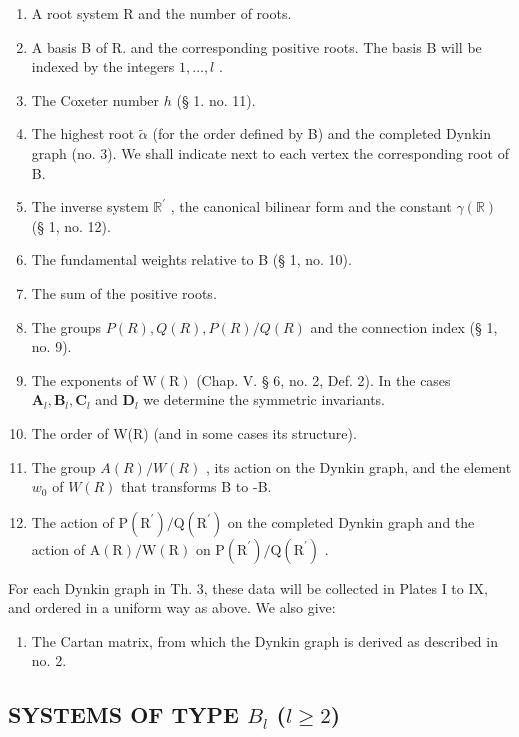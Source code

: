 \begin{enumerate}
\def\labelenumi{(\Roman{enumi})}
\item
  A root system R and the number of roots.
\item
  A basis B of R. and the corresponding positive roots. The basis B will be indexed by the integers \(1,\ldots,l\) .
\item
  The Coxeter number \(h\) (§ 1. no. 11).
\item
  The highest root \(\tilde{\alpha}\) (for the order defined by B) and the completed Dynkin graph (no. 3). We shall indicate next to each vertex the corresponding root of B.
\item
  The inverse system \(\mathbb{R}^{\prime}\) , the canonical bilinear form and the constant \(\gamma(\mathbb{R})\) (§ 1, no. 12).
\item
  The fundamental weights relative to B (§ 1, no. 10).
\item
  The sum of the positive roots.
\item
  The groups \(P(R), Q(R), P(R)/Q(R)\) and the connection index (§ 1, no. 9).
\item
  The exponents of \(\mathrm{W}(\mathrm{R})\) (Chap. V. § 6, no. 2, Def. 2). In the cases \(\mathbf{A}_l, \mathbf{B}_l, \mathbf{C}_l\) and \(\mathbf{D}_l\) we determine the symmetric invariants.
\item
  The order of W(R) (and in some cases its structure).
\item
  The group \(A(R)/W(R)\) , its action on the Dynkin graph, and the element \(w_{0}\) of \(W(R)\) that transforms B to -B.
\item
  The action of \(\mathrm{P}(\mathrm{R}^{\prime})/\mathrm{Q}(\mathrm{R}^{\prime})\) on the completed Dynkin graph and the action of \(\mathrm{A}(\mathrm{R})/\mathrm{W}(\mathrm{R})\) on \(\mathrm{P}(\mathrm{R}^{\prime})/\mathrm{Q}(\mathrm{R}^{\prime})\) .
\end{enumerate}

For each Dynkin graph in Th. 3, these data will be collected in Plates I to IX, and ordered in a uniform way as above. We also give:

\begin{enumerate}
\def\labelenumi{(\Roman{enumi})}
\setcounter{enumi}{12}
\tightlist
\item
  The Cartan matrix, from which the Dynkin graph is derived as described in no. 2.
\end{enumerate}

\subsection{\texorpdfstring{SYSTEMS OF TYPE \(B_{l}\) (\(l \geqslant 2\))}{SYSTEMS OF TYPE B\_l (l >= 2)}}

